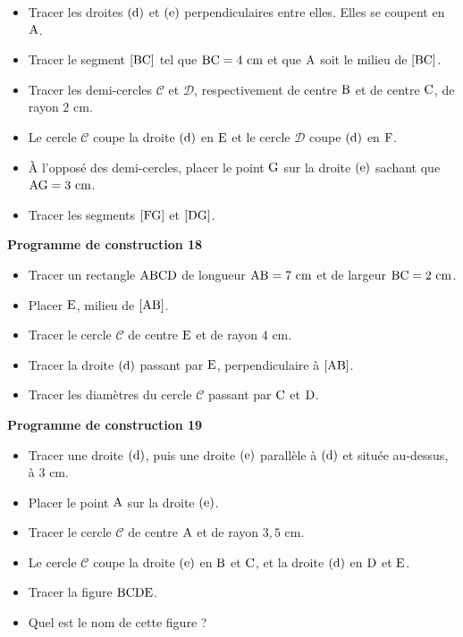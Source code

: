 \documentclass{article}
\begin{document}
\begin{itemize}
    \item Tracer les droites $(\text{d})$ et $(\text{e})$
    perpendiculaires entre elles. Elles se coupent en $\text{A}$.
    \item Tracer le segment $[\text{BC}]$ tel que
    $\text{BC}=4\text{ cm}$ et que $\text{A}$ soit le milieu
    de $[\text{BC}]$.
    \item Tracer les demi-cercles $\mathcal{C}$ et $\mathcal{D}$,
    respectivement de centre $\text{B}$ et de centre
    $\text{C}$, de rayon $2\text{ cm}$.
    \item Le cercle $\mathcal{C}$ coupe la droite $(\text{d})$ en
    $\text{E}$ et le cercle $\mathcal{D}$ coupe $(\text{d})$
    en $\text{F}$.
    \item À l'opposé des demi-cercles, placer le point $\text{G}$ sur
    la droite $(\text{e})$ sachant que $\text{AG}=3\text{ cm}$.
    \item Tracer les segments $[\text{FG}]$ et $[\text{DG}]$.
\end{itemize}
\noindent\textbf{Programme de construction 18}\par\smallskip\noindent
\begin{itemize}
    \item Tracer un rectangle $\text{ABCD}$ de longueur
    $\text{AB}=7\text{ cm}$ et de largeur $\text{BC}=2\text{ cm}$.
    \item Placer $\text{E}$, milieu de $[\text{AB}]$.
    \item Tracer le cercle $\mathcal{C}$ de centre $\text{E}$ et de
    rayon $4\text{ cm}$.
    \item Tracer la droite $(\text{d})$ passant par
    $\text{E}$, perpendiculaire à $[\text{AB}]$.
    \item Tracer les diamètres du cercle $\mathcal{C}$ passant par
    $\text{C}$ et $\text{D}$.
\end{itemize}
\noindent\textbf{Programme de construction 19}\par\smallskip\noindent
\begin{itemize}
    \item Tracer une droite $(\text{d})$, puis une droite
    $(\text{e})$ parallèle à $(\text{d})$ et située au-dessus,
    à $3\text{ cm}$.
    \item Placer le point $\text{A}$ sur la droite $(\text{e})$.
    \item Tracer le cercle $\mathcal{C}$ de centre $\text{A}$ et de
    rayon $3{,}5\text{ cm}$.
    \item Le cercle $\mathcal{C}$ coupe la droite $(\text{e})$ en
    $\text{B}$ et $\text{C}$, et la droite
    $(\text{d})$ en $\text{D}$ et $\text{E}$.
    \item Tracer la figure $\text{BCDE}$.
    \item Quel est le nom de cette figure ?
\end{itemize}
\end{document}
